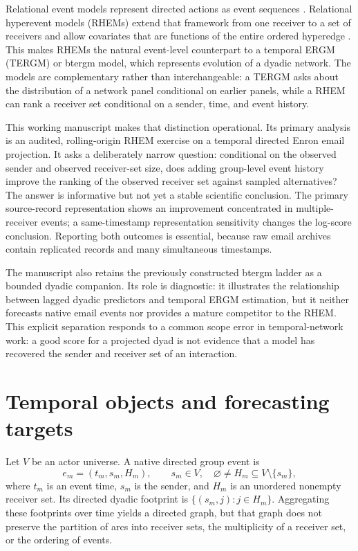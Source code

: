 \documentclass[11pt]{article}
\begin{document}
Relational event models represent directed actions as event sequences \citep{butts2008}. Relational hyperevent models (RHEMs) extend that framework from one receiver to a set of receivers and allow covariates that are functions of the entire ordered hyperedge \citep{lernerLomi2023}. This makes RHEMs the natural event-level counterpart to a temporal ERGM (TERGM) or btergm model, which represents evolution of a dyadic network. The models are complementary rather than interchangeable: a TERGM asks about the distribution of a network panel conditional on earlier panels, while a RHEM can rank a receiver set conditional on a sender, time, and event history.

This working manuscript makes that distinction operational. Its primary analysis is an audited, rolling-origin RHEM exercise on a temporal directed Enron email projection. It asks a deliberately narrow question: conditional on the observed sender and observed receiver-set size, does adding group-level event history improve the ranking of the observed receiver set against sampled alternatives? The answer is informative but not yet a stable scientific conclusion. The primary source-record representation shows an improvement concentrated in multiple-receiver events; a same-timestamp representation sensitivity changes the log-score conclusion. Reporting both outcomes is essential, because raw email archives contain replicated records and many simultaneous timestamps.

The manuscript also retains the previously constructed btergm ladder as a bounded dyadic companion. Its role is diagnostic: it illustrates the relationship between lagged dyadic predictors and temporal ERGM estimation, but it neither forecasts native email events nor provides a mature competitor to the RHEM. This explicit separation responds to a common scope error in temporal-network work: a good score for a projected dyad is not evidence that a model has recovered the sender and receiver set of an interaction.

\section{Temporal objects and forecasting targets}\label{sec:targets}

Let $V$ be an actor universe. A native directed group event is
\begin{equation}
 e_m=(t_m,s_m,H_m), \qquad s_m\in V, \quad \varnothing\ne H_m\subseteq V\setminus\{s_m\},
 \label{eq:event}
\end{equation}
where $t_m$ is an event time, $s_m$ is the sender, and $H_m$ is an unordered nonempty receiver set. Its directed dyadic footprint is $\{(s_m,j):j\in H_m\}$. Aggregating these footprints over time yields a directed graph, but that graph does not preserve the partition of arcs into receiver sets, the multiplicity of a receiver set, or the ordering of events.
\end{document}
